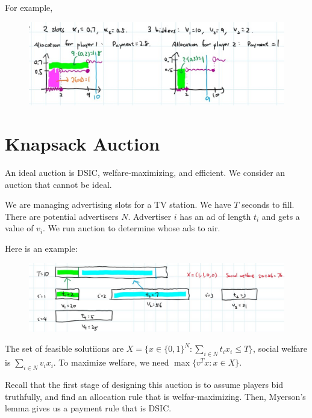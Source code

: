 \documentclass[twoside]{article}
\begin{document}
\begin{enumerate}
		      For example,
		      \begin{center}
		      	\begin{figure}[h!]
		      		\includegraphics[width=\textwidth]{myerson_6.png}
		      	\end{figure}
		      \end{center}
	\end{enumerate}
	
	\section{Knapsack Auction}
	An ideal auction is DSIC, welfare-maximizing, and efficient. We consider an auction that cannot be ideal. 
	
	We are managing advertising slots for a TV station. We have $T$ seconds to fill. There are potential advertisers $N$. Advertiser $i$ has an ad of length $t_i$ and gets a value of $v_i$. We run auction to determine whose ads to air. 
	
	Here is an example: 
	\begin{center}
		\begin{figure}[h!]
			\includegraphics[width=\textwidth]{knapsack.png}
		\end{figure}
	\end{center}
	
	The set of feasible solutiions are $X = \{x \in \{0, 1\}^N : \sum_{i \in N} t_i x_i \leq T\}$, social welfare is $\sum_{i \in N} v_ix_i$. To maximize welfare, we need $\max \{v^Tx : x \in X\}$. 
	
	Recall that the first stage of designing this auction is to assume players bid truthfully, and find an allocation rule that is welfar-maximizing. Then, Myerson's lemma gives us a payment rule that is DSIC. 
	
\end{document}

